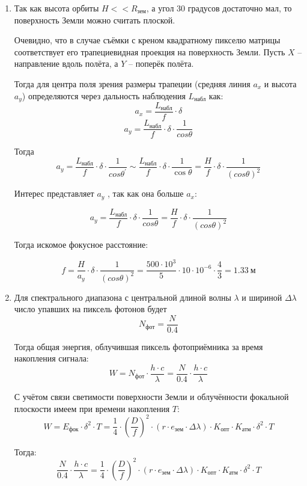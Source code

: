 \begin{enumerate}
\item Так как высота орбиты $H<<R_\text{зем}$, а угол 30 градусов достаточно мал, то поверхность Земли можно считать плоской. 

Очевидно, что в случае съёмки с креном квадратному пикселю матрицы соответствует его трапециевидная проекция на поверхность 
Земли. Пусть $X$ – направление вдоль полёта, а $Y$ – поперёк полёта.  

Тогда для центра поля зрения размеры трапеции (средняя линия $a_x$ и высота~$a_y$) определяются через дальность наблюдения $L_\text{набл}$ как:
$$a_x=\frac{L_\text{набл}}{f}\cdot \delta $$
$$a_y=\frac{L_\text{набл}}{f}\cdot \delta \cdot \frac{1}{cos\theta}$$ 

Тогда
$$a_y=\frac{L_\text{набл}}{f} \cdot \delta \cdot \frac{1}{cos\theta^{'}} \sim \frac{L_\text{набл}}{f}\cdot \delta \cdot \frac{1}{\cos\theta} =\frac{H}{f}\cdot \delta \cdot \frac{1}{(cos\theta )^2} $$
 
Интерес представляет $a_y$ , так как она больше $a_x$:

$$a_y=\frac{L_\text{набл}}{f} \cdot \delta \cdot \frac{1}{cos\theta} =\frac{H}{f}\cdot \delta \cdot \frac{1}{(cos\theta )^2}$$

Тогда искомое фокусное расстояние:

$$f=\frac{H}{a_y} \cdot \delta \cdot \frac{1}{(cos\theta )^2} =\frac{500\cdot 10^3}{5}\cdot 10\cdot 10^{-6}\cdot \frac{4}{3}=1.33 \: \text{м}$$

\item Для спектрального диапазона с центральной длиной волны $\lambda$ и шириной $\Delta \lambda$ число упавших на пиксель фотонов будет
$$N_\text{фот}=\frac{N}{0.4}$$

Тогда общая энергия, облучившая пиксель фотоприёмника за время накопления сигнала:
$$W=N_\text{фот}\cdot \frac{h\cdot c}{\lambda}=\frac{N}{0.4}\cdot \frac{h\cdot c}{\lambda}$$

С учётом связи светимости поверхности Земли и облучённости фокальной плоскости имеем при времени накопления $T$:
$$W=E_\text{фок}\cdot \delta^2\cdot T =  \frac{1}{4}  \cdot \left(\frac{D}{f}\right)^2 \cdot (r\cdot e_\text{зем}\cdot \Delta \lambda)\cdot K_\text{опт}\cdot K_\text{атм}\cdot \delta^2\cdot T$$

Тогда:
$$\frac{N}{0.4}\cdot \frac{h\cdot c}{\lambda}=  \frac{1}{4}  \cdot \left(\frac{D}{f}\right)^2\cdot (r\cdot e_\text{зем}\cdot \Delta \lambda)\cdot K_\text{опт}\cdot K_\text{атм}\cdot \delta ^2\cdot T$$


\end{enumerate}
